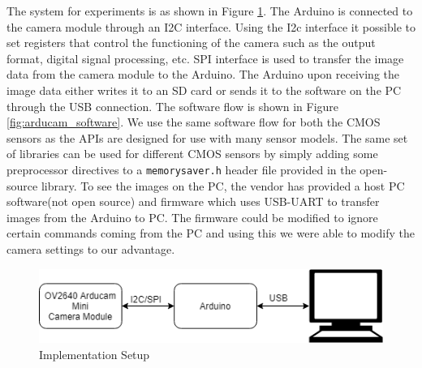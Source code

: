 The system for experiments is as shown in Figure \ref{fig:imp_setup}. The Arduino is connected to the camera module through an I2C interface. Using the I2c interface it possible to set registers that control the functioning of the camera such as the output format, digital signal processing, etc. SPI interface is used to transfer the image data from the camera module to the Arduino. The Arduino upon receiving the image data either writes it to an  SD card or sends it to the software on the PC through the USB connection. The software flow is shown in Figure \ref{fig:arducam_software}. We use the same software flow for both the CMOS sensors as the APIs are designed for use with many sensor models. The same set of libraries can be used for different CMOS sensors by simply adding some preprocessor directives to a \texttt{memorysaver.h} header file provided in the open-source library. To see the images on the PC, the vendor has provided a host PC software(not open source) and firmware which uses USB-UART to transfer images from the Arduino to PC. The firmware could be modified to ignore certain commands coming from the PC and using this we were able to modify the camera settings to our advantage. 
\begin{figure}[!htbp]
\centering
\includegraphics[scale=0.75]{pics/implementation_setup}
\caption{Implementation Setup}
\label{fig:imp_setup}
\end{figure}

